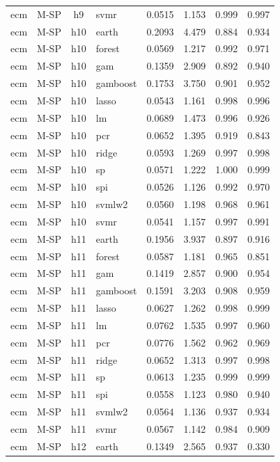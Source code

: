 \begin{ThreePartTable}
\begin{longtable}[t]{llclcccc}
ecm & M-SP & h9 & svmr & 0.0515 & 1.153 & 0.999 & 0.997\\
\addlinespace
ecm & M-SP & h10 & earth & 0.2093 & 4.479 & 0.884 & 0.934\\
ecm & M-SP & h10 & forest & 0.0569 & 1.217 & 0.992 & 0.971\\
ecm & M-SP & h10 & gam & 0.1359 & 2.909 & 0.892 & 0.940\\
ecm & M-SP & h10 & gamboost & 0.1753 & 3.750 & 0.901 & 0.952\\
ecm & M-SP & h10 & lasso & 0.0543 & 1.161 & 0.998 & 0.996\\
ecm & M-SP & h10 & lm & 0.0689 & 1.473 & 0.996 & 0.926\\
ecm & M-SP & h10 & pcr & 0.0652 & 1.395 & 0.919 & 0.843\\
ecm & M-SP & h10 & ridge & 0.0593 & 1.269 & 0.997 & 0.998\\
ecm & M-SP & h10 & sp & 0.0571 & 1.222 & 1.000 & 0.999\\
ecm & M-SP & h10 & spi & 0.0526 & 1.126 & 0.992 & 0.970\\
ecm & M-SP & h10 & svmlw2 & 0.0560 & 1.198 & 0.968 & 0.961\\
ecm & M-SP & h10 & svmr & 0.0541 & 1.157 & 0.997 & 0.991\\
\addlinespace
ecm & M-SP & h11 & earth & 0.1956 & 3.937 & 0.897 & 0.916\\
ecm & M-SP & h11 & forest & 0.0587 & 1.181 & 0.965 & 0.851\\
ecm & M-SP & h11 & gam & 0.1419 & 2.857 & 0.900 & 0.954\\
ecm & M-SP & h11 & gamboost & 0.1591 & 3.203 & 0.908 & 0.959\\
ecm & M-SP & h11 & lasso & 0.0627 & 1.262 & 0.998 & 0.999\\
ecm & M-SP & h11 & lm & 0.0762 & 1.535 & 0.997 & 0.960\\
ecm & M-SP & h11 & pcr & 0.0776 & 1.562 & 0.962 & 0.969\\
ecm & M-SP & h11 & ridge & 0.0652 & 1.313 & 0.997 & 0.998\\
ecm & M-SP & h11 & sp & 0.0613 & 1.235 & 0.999 & 0.999\\
ecm & M-SP & h11 & spi & 0.0558 & 1.123 & 0.980 & 0.940\\
ecm & M-SP & h11 & svmlw2 & 0.0564 & 1.136 & 0.937 & 0.934\\
ecm & M-SP & h11 & svmr & 0.0567 & 1.142 & 0.984 & 0.909\\
\addlinespace
ecm & M-SP & h12 & earth & 0.1349 & 2.565 & 0.937 & 0.330\\

\end{longtable}
\end{ThreePartTable}
